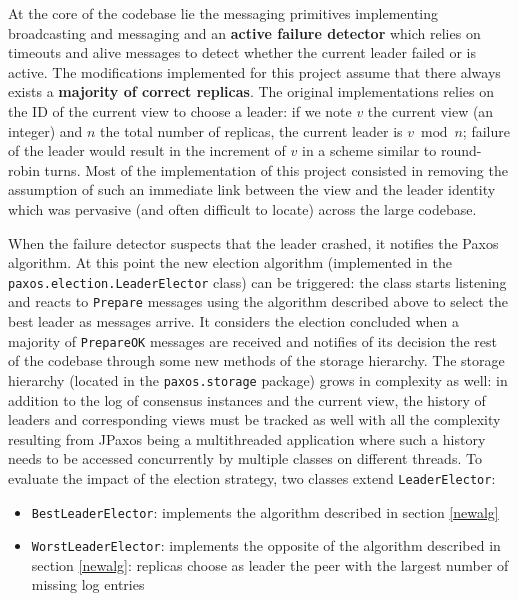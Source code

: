 \documentclass[a4paper, 10pt]{article}
\begin{document}
At the core of the codebase lie the messaging primitives implementing broadcasting and messaging and an \textbf{active failure detector} which relies on timeouts and alive messages to detect whether the current leader failed or is active. The modifications implemented for this project assume that there always exists a \textbf{majority of correct replicas}.
The original implementations relies on the ID of the current view to choose a leader: if we note $v$ the current view (an integer) and $n$ the total number of replicas, the current leader is $v \bmod n$; failure of the leader would result in the increment of $v$ in a scheme similar to round-robin turns.  Most of the implementation of this project consisted in removing the assumption of such an immediate link between the view and the leader identity which was pervasive (and often difficult to locate) across the large codebase.

When the failure detector suspects that the leader crashed, it notifies the Paxos algorithm. At this point the new election algorithm (implemented in the \texttt{paxos.election.LeaderElector} class) can be triggered: the class starts listening and reacts to \texttt{Prepare} messages using the algorithm described above to select the best leader as messages arrive. It considers the election concluded when a majority of \texttt{PrepareOK} messages are received and notifies of its decision the rest of the codebase through some new methods of the storage hierarchy. The storage hierarchy (located in the \texttt{paxos.storage} package) grows in complexity as well: in addition to the log of consensus instances and the current view, the history of leaders and corresponding views must be tracked as well with all the complexity resulting from JPaxos being a multithreaded application where such a history needs to be accessed concurrently by multiple classes on different threads. To evaluate the impact of the election strategy, two classes extend \texttt{LeaderElector}:
\begin{itemize}
    \item \texttt{BestLeaderElector}: implements the algorithm described in section \ref{newalg}
    \item \texttt{WorstLeaderElector}: implements the opposite of the algorithm described in section \ref{newalg}: replicas choose as leader the peer with the largest number of missing log entries 
\end{itemize}
\end{document}
